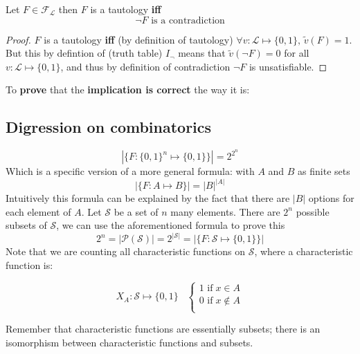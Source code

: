 	\begin{fact} Let $F \in \mathcal{F}_\mathcal{L}$ then $F$ is a tautology \textbf{iff}
	  $$ \neg F \text{ is a contradiction}$$
	\end{fact}

	\begin{proof}
		$F$ is a tautology \textbf{iff} (by definition of tautology)  $\forall v: \mathcal{L} \mapsto \{0,1\}, \, \tilde{v} (F) = 1$. But this by defintion of (truth table) $I_\neg$ means that $\tilde{v} (\neg F) = 0$ for all $v: \mathcal{L} \mapsto \{0,1\}$, and thus by definition of contradiction $\neg F$ is unsatisfiable.
	\end{proof}

	To \textbf{prove} that the \textbf{implication is correct} the way it is:

	\label{combinatorics}
	\subsection{Digression on combinatorics}
		$$ |\{F : \{0,1\}^n \mapsto \{0,1\} \}| = 2^{2^n} $$
		Which is a specific version of a more general formula: with $A$ and $B$ as finite sets
		$$ |\{F : A \mapsto B \}| = |B|^{|A|} $$
		Intuitively this formula can be explained by the fact that there are $|B|$ options for each element of $A$. Let $\mathcal{S}$ be a set of $n$ many elements. There are $2^n$ possible subsets of $\mathcal{S}$, we can use the aforementioned formula to prove this
		$$ 2^n = |\mathcal{P} (\mathcal{S})| = 2^{|\mathcal{S}|} = |\{F : \mathcal{S} \mapsto \{0,1\}\}|$$
		Note that we are counting all characteristic functions on $\mathcal{S}$, where a characteristic function is:

		$$ X_A :  \mathcal{S} \mapsto \{0,1\} \;\;\;
		\begin{cases}
			1 \text{ if} \; x \in A \\
			0 \text{ if} \; x \notin A \\
		\end{cases}
		$$

		Remember that characteristic functions are essentially subsets; there is an isomorphism between characteristic functions and subsets.

